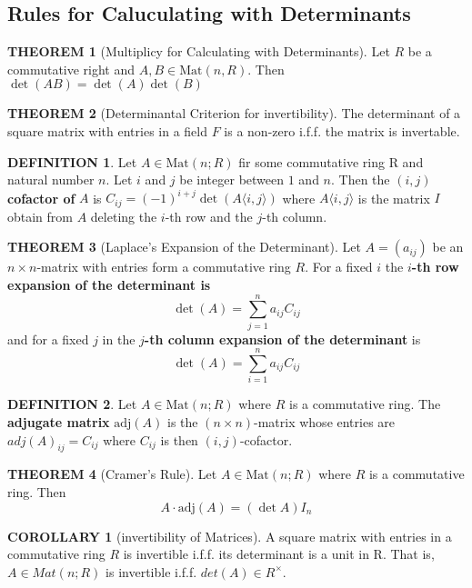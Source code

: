 \documentclass[10pt]{article}
\theoremstyle{definition}
\newtheorem{definition}{DEFINITION}[subsection]
\newtheorem{theorem}{THEOREM}[subsection]
\newcommand{\Mat}{\text{Mat}}
\newcommand{\adj}{\text{adj}}
\newtheorem{corollary}{COROLLARY}[subsection]
\begin{document}
\subsection{Rules for Caluculating with Determinants}
\begin{theorem}[Multiplicy for Calculating with Determinants]
    Let $R$ be a commutative right and $A,B \in \Mat(n,R)$. Then $\det(AB) = \det(A)\det(B)$
\end{theorem}

\begin{theorem}[Determinantal Criterion for invertibility]
    The determinant of a square matrix with entries in a field $F$ is a non-zero i.f.f. the matrix is invertable.
\end{theorem}

\begin{definition}
    Let $A\in \Mat(n;R)$ fir some commutative ring R and natural number $n$. Let $i$ and $j$ be integer between $1$ and $n$. Then the $(i,j)$ \textbf{cofactor of} $A$ is $C_{ij} = (-1)^{i+j}\det(A\langle i,j\rangle)$ where $A\langle i,j\rangle$ is the matrix $I$ obtain from $A$ deleting the $i$-th row and the $j$-th column.
\end{definition}

\begin{theorem}[Laplace's Expansion of the Determinant]
    Let $A = (a_{ij})$ be an $n\times n$-matrix with entries form a commutative ring $R$. For a fixed $i$ the \textbf{$i$-th row expansion of the determinant is}
    $$\det(A) = \sum_{j=1}^{n} a_{ij}C_{ij}$$
    and for a fixed $j$ in the \textbf{$j$-th column expansion of the determinant} is
    $$\det(A) = \sum_{i =1}^n a_{ij}C_{ij}$$
\end{theorem}

\begin{definition}
    Let $A\in \Mat(n;R)$ where $R$ is a commutative ring. The \textbf{adjugate matrix} $\adj(A)$ is the $(n \times n)$-matrix whose entries are $adj(A)_{ij} = C_{ij}$ where $C_{ij}$ is then $(i,j)$-cofactor.
\end{definition}

\begin{theorem}[Cramer's Rule]
    Let $A \in \Mat(n;R)$ where $R$ is a commutative ring. Then
    $$A\cdot \adj(A) = (\det A)I_n$$
\end{theorem}

\begin{corollary}[invertibility of Matrices]
    A square matrix with entries in a commutative ring $R$ is invertible i.f.f. its determinant is a unit in R. That is, $A \in Mat(n; R)$ is invertible i.f.f. $det(A) \in R^\times$.
\end{corollary}
\end{document}
